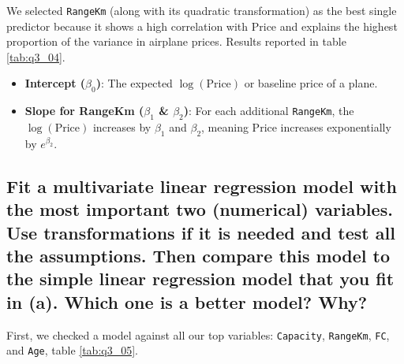 We selected \texttt{RangeKm} (along with its quadratic transformation) as the best single predictor because it shows a high correlation with Price and explains the highest proportion of the variance in airplane prices. Results reported in table \ref{tab:q3_04}.
\begin{itemize}
    \item \textbf{Intercept ($\beta_0$)}: The expected $\log(\text{Price})$ or baseline price of a plane.
    \item \textbf{Slope for RangeKm ($\beta_1$ \& $\beta_2$)}: For each additional \texttt{RangeKm}, the $\log(\text{Price})$ increases by $\beta_1$ and $\beta_2$, meaning Price increases exponentially by $e^{\beta_2}$.
\end{itemize}

\subsection[Q3-b]{Fit a multivariate linear regression model with the most important two (numerical) variables. Use transformations if it is needed and test all the assumptions. Then compare this model to the simple linear regression model that you fit in (a). Which one is a better model? Why?}

First, we checked a model against all our top variables: \texttt{Capacity}, \texttt{RangeKm}, \texttt{FC}, and \texttt{Age}, table \ref{tab:q3_05}.

